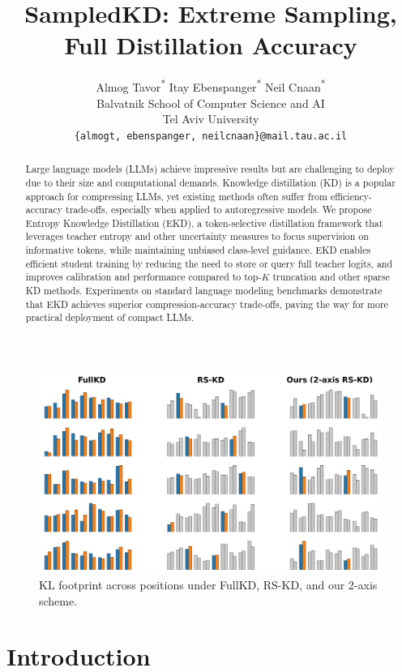 \documentclass[11pt]{article}
\title{SampledKD: Extreme Sampling, Full Distillation Accuracy}
\author{
  Almog Tavor\textsuperscript{*} \qquad Itay Ebenspanger\textsuperscript{*} \qquad Neil Cnaan\textsuperscript{*} \\
  Balvatnik School of Computer Science and AI \\
  Tel Aviv University \\
  \texttt{\{almogt, ebenspanger, neilcnaan\}@mail.tau.ac.il} \\
}
\begin{document}
\maketitle
\let\thefootnote\relax
\footnotemark
{}
\begin{abstract}
	Large language models (LLMs) achieve impressive results but are challenging to deploy due to their size and computational demands. Knowledge distillation (KD) is a popular approach for compressing LLMs, yet existing methods often suffer from efficiency-accuracy trade-offs, especially when applied to autoregressive models. We propose Entropy Knowledge Distillation (EKD), a token-selective distillation framework that leverages teacher entropy and other uncertainty measures to focus supervision on informative tokens, while maintaining unbiased class-level guidance. EKD enables efficient student training by reducing the need to store or query full teacher logits, and improves calibration and performance compared to top-$K$ truncation and other sparse KD methods. Experiments on standard language modeling benchmarks demonstrate that EKD achieves superior compression-accuracy trade-offs, paving the way for more practical deployment of compact LLMs.
\end{abstract}

\begin{figure}[t]
	\begin{flushright}
		\includegraphics[width=\linewidth]{kd_intuition.png}
	\end{flushright}
	\caption{KL footprint across positions under FullKD, RS-KD, and our 2-axis scheme.}
	\label{fig:kd_intuition}
\end{figure}


\section{Introduction}
\end{document}
